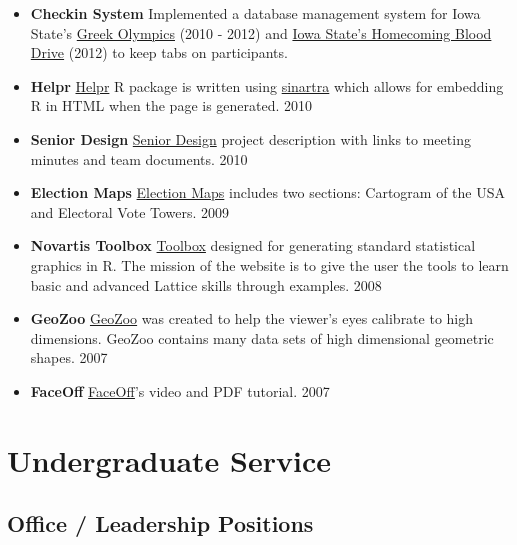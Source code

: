\documentclass[oneside]{article}
\begin{document}
\begin{itemize}
  
  \item{\bf Checkin System} Implemented a database management system for Iowa State's \href{http://www.greekweek.barretschloerke.com/}{Greek Olympics} (2010 - 2012) and \href{http://www.homecoming.barretschloerke.com/}{Iowa State's Homecoming Blood Drive} (2012) to keep tabs on participants.
  
  \item{\bf Helpr} \href{http://github.com/hadley/helpr}{Helpr} {R} package is written using \href{http://github.com/hadley/sinartra}{sinartra} which allows for embedding R in HTML when the page is generated. 2010
  
  \item{\bf Senior Design} 
  \href{http://seniord.ece.iastate.edu/dec1009/}{Senior Design} project description with links to meeting minutes and team documents. 2010
  
  \item{\bf Election Maps} \href{http://barretschloerke.com/Election/index.html}{Election Maps} includes two sections: Cartogram of the USA and Electoral Vote Towers. 2009
  
  \item{\bf Novartis Toolbox} \href{http://barretschloerke.com/Novartis/}{Toolbox} designed for generating standard statistical graphics in R. The mission of the website is to give the user the tools to learn basic and advanced Lattice skills through examples. 2008
  
  \item{\bf GeoZoo} \href{http://streaming.stat.iastate.edu/~dicook/geometric-data/}{GeoZoo} was created to help the viewer's eyes calibrate to high dimensions. GeoZoo contains many data sets of high dimensional geometric shapes. 2007
  
  \item{\bf FaceOff} \href{http://www.public.iastate.edu/~bigbear/FaceOff/index.html}{FaceOff}'s video and PDF tutorial. 2007 
  
\end{itemize}





\section{Undergraduate Service}
\subsection{Office / Leadership Positions}
\end{document}
